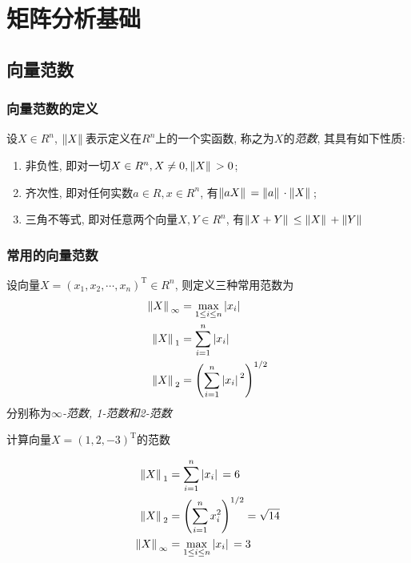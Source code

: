 \chapter{矩阵分析基础}

\section{向量范数}

\subsection{向量范数的定义}

\begin{definition}
    设$X\in R^n$, $\norm*{X}$表示定义在$R^n$上的一个实函数, 称之为$X$的\emph{范数}, 其具有如下性质:
    \begin{enumerate}
        \item 非负性, 即对一切$X\in R^n, X\ne0, \norm*{X}>0$;
        \item 齐次性, 即对任何实数$a\in R, x\in R^n$, 有$\norm*{aX}=\norm*{a}\cdot\norm*{X}$;
        \item 三角不等式, 即对任意两个向量$X, Y\in R^n$, 有$\norm*{X+Y}\le\norm*{X}+\norm*{Y}$
    \end{enumerate}
\end{definition}

\subsection{常用的向量范数}

设向量$X=(x_1,x_2,\cdots,x_n)^\text{T}\in R^n$, 则定义三种常用范数为
\begin{align*}
    \norm*{X}_\infty&=\max_{1\le i\le n}\abs*{x_i}\\
    \norm*{X}_1&=\sum_{i=1}^n\abs*{x_i}\\
    \norm*{X}_2&=\left(\sum_{i=1}^n\abs*{x_i}^2\right)^{1/2}
\end{align*}
分别称为\emph{$\infty$-范数, 1-范数和2-范数}

\begin{example}
    计算向量$X=(1,2,-3)^\text{T}$的范数
\end{example}
\begin{solution}
    \begin{align*}
        \norm*{X}_1&=\sum_{i=1}^n\abs*{x_i}=6\\
        \norm*{X}_2&=\left(\sum_{i=1}^nx_i^2\right)^{1/2}=\sqrt{14}\\
        \norm*{X}_\infty&=\max_{1\le i\le n}\abs*{x_i}=3
    \end{align*}
\end{solution}

